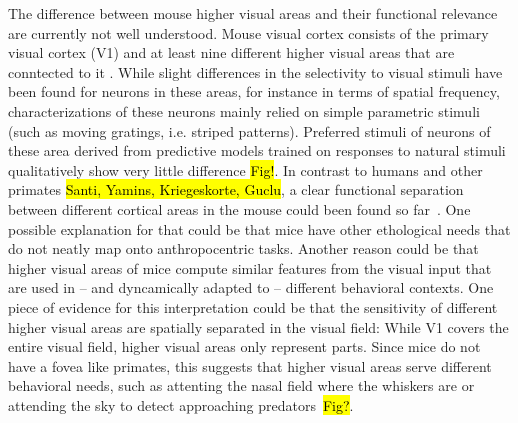 \documentclass[B2,COG]{ercgrant}
\begin{document}
The difference between mouse higher visual areas and their functional relevance are currently not well understood. Mouse visual cortex consists of the primary visual cortex (V1) and at least nine different higher visual areas that are conntected to it \parencite[AL, LM, LI, PM, RL, P, AM, POR, A, see ][]{Garrett2014-zm,Froudarakis2019-yt}. 
While slight differences in the selectivity to visual stimuli have been found for neurons in these areas, for instance in terms of spatial frequency, characterizations of these neurons mainly relied on simple parametric stimuli (such as moving gratings, i.e. striped patterns). Preferred stimuli of neurons of these area derived from predictive models trained on responses to natural stimuli qualitatively show very little difference \hl{Fig!}. 
In contrast to  humans and other primates \hl{Santi, Yamins, Kriegeskorte, Guclu}, a clear functional separation between different cortical areas in the mouse could been found so far~\parencite{Conwell2021-pw}.
One possible explanation for that could be that mice have other ethological needs that do not neatly map onto anthropocentric tasks. 
Another reason could be that higher visual areas of mice compute similar features from the visual input that are used in -- and dyncamically adapted to -- different behavioral contexts. 
One piece of evidence for this interpretation could be that the sensitivity of different higher visual areas are spatially separated in the visual field: 
While V1 covers the entire visual field, higher visual areas only represent parts. 
Since mice do not have a fovea like primates, this suggests that higher visual areas serve different behavioral needs, such as attenting the nasal field where the whiskers are or attending the sky to detect approaching predators~\parencite{Garrett2014-zm, Froudarakis2019-yt, Franke2022-do}\hl{Fig?}. 
\end{document}
